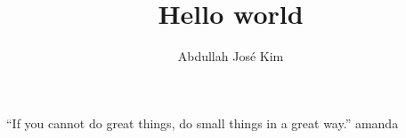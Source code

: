 \documentclass{gescons}
\title {Hello world}
\author{Abdullah José Kim}
\begin{document}
    \maketitle


    \begin{multicols}{3}
        \begin{lead}
            \lipsum[1]
        \end{lead}

        \lipsum[2-3]
        
        \begin{pullquote}
            ``If you cannot do great things, do small things in a great way.'' amanda
        \end{pullquote}
        
        \lipsum[4]
        
    \end{multicols}
\end{document}
